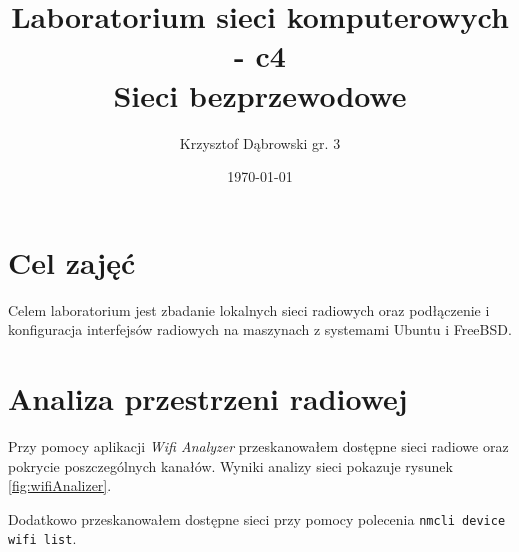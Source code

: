 \documentclass{mwart} %
\title{Laboratorium sieci komputerowych - c4 \\ Sieci bezprzewodowe}
\author{Krzysztof Dąbrowski gr. 3}
\date{\today}
\begin{document}
\maketitle{}
\tableofcontents{}

\section{Cel zajęć}
Celem laboratorium jest zbadanie lokalnych sieci radiowych oraz podłączenie i konfiguracja interfejsów radiowych na maszynach z systemami Ubuntu i FreeBSD.

\section{Analiza przestrzeni radiowej}
Przy pomocy aplikacji \textit{Wifi Analyzer} przeskanowałem dostępne sieci radiowe oraz pokrycie poszczególnych kanałów.
Wyniki analizy sieci pokazuje rysunek \ref{fig:wifiAnalizer}.


Dodatkowo przeskanowałem dostępne sieci przy pomocy polecenia \texttt{nmcli device wifi list}.
\end{document}
